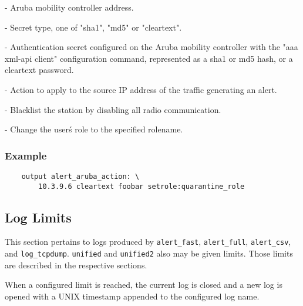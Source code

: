 \documentclass[english]{report}
\begin{document}
\begin{description}{}

\item [\texttt{controller address}] - Aruba mobility controller address.

\item [\texttt{secrettype}] - Secret type, one of "sha1", "md5" or "cleartext".

\item [\texttt{secret}] - Authentication secret configured on the Aruba
mobility controller with the "aaa xml-api client" configuration command,
represented as a sha1 or md5 hash, or a cleartext password.

\item [\texttt{action}] - Action to apply to the source IP address of the
traffic generating an alert.

  \begin{description}{}

      \item [\texttt{blacklist}]- Blacklist the station by disabling all radio
communication.

      \item [\texttt{setrole:rolename}]- Change the user\'s role to the
specified rolename.

  \end{description}
\end{description}

\subsubsection{Example}

\begin{verbatim}
    output alert_aruba_action: \
        10.3.9.6 cleartext foobar setrole:quarantine_role
\end{verbatim}

\subsection{Log Limits}
\label{Log Limits}

This section pertains to logs produced by \texttt{alert\_fast},
\texttt{alert\_full}, \texttt{alert\_csv}, and \texttt{log\_tcpdump}.
\texttt{unified} and \texttt{unified2} also may be given limits.  Those limits
are described in the respective sections.

When a configured limit is reached, the current log is closed and a new log is
opened with a UNIX timestamp appended to the configured log name.
\end{document}
